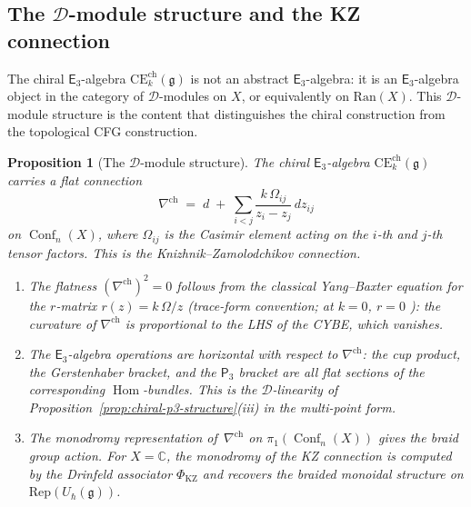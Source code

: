 \documentclass[11pt,reqno]{amsart}
\newtheorem{proposition}[theorem]{Proposition}
\theoremstyle{definition}
\theoremstyle{remark}
\newcommand{\cD}{\mathcal{D}}
\newcommand{\Ran}{\mathrm{Ran}}
\newcommand{\CE}{\mathrm{CE}}
\newcommand{\Ethree}{\mathsf{E}_{3}}
\newcommand{\Pthree}{\mathsf{P}_{3}}
\DeclareMathOperator{\Hom}{Hom}
\DeclareMathOperator{\Conf}{Conf}
\newcommand{\fg}{\mathfrak{g}}
\newcommand{\CC}{\mathbb{C}}
\numberwithin{equation}{section}
\begin{document}
\subsection{The $\cD$-module structure and the KZ connection}
\label{subsec:chiral-e3-dmod}

The chiral $\Ethree$-algebra
$\CE^{\mathrm{ch}}_k(\fg)$ is not an abstract
$\Ethree$-algebra: it is an $\Ethree$-algebra object
in the category of $\cD$-modules on $X$, or equivalently
on $\Ran(X)$. This $\cD$-module structure is the content
that distinguishes the chiral construction from the
topological CFG construction.

\begin{proposition}[The $\cD$-module structure]
\label{prop:chiral-e3-dmod}
The chiral $\Ethree$-algebra
$\CE^{\mathrm{ch}}_k(\fg)$ carries a flat connection
\begin{equation}\label{eq:chiral-e3-connection}
  \nabla^{\mathrm{ch}}
  \;=\;
  d \;+\; \sum_{i < j}
  \frac{k\,\Omega_{ij}}{z_i - z_j}\,dz_{ij}
\end{equation}
on $\Conf_n(X)$, where $\Omega_{ij}$ is the Casimir element
acting on the $i$-th and $j$-th tensor factors. This is the
Knizhnik--Zamolodchikov connection.
\begin{enumerate}[label=\textup{(\roman*)}]
\item The flatness
  $(\nabla^{\mathrm{ch}})^2 = 0$ follows from the
  classical Yang--Baxter equation for the $r$-matrix
  $r(z) = k\,\Omega/z$
  \textup{(}trace-form convention; at $k = 0$, $r = 0$%
  \textup{)}: the curvature of $\nabla^{\mathrm{ch}}$
  is proportional to the LHS of the CYBE, which vanishes.
\item The $\Ethree$-algebra operations are horizontal
  with respect to $\nabla^{\mathrm{ch}}$: the cup product,
  the Gerstenhaber bracket, and the $\Pthree$ bracket are
  all flat sections of the corresponding $\Hom$-bundles.
  This is the $\cD$-linearity of
  Proposition~\textup{\ref{prop:chiral-p3-structure}(iii)}
  in the multi-point form.
\item The monodromy representation of~$\nabla^{\mathrm{ch}}$
  on $\pi_1(\Conf_n(X))$ gives the braid group action.
  For $X = \CC$, the monodromy of the KZ connection
  is computed by the Drinfeld associator
  $\Phi_{\mathrm{KZ}}$
  and recovers the braided monoidal structure on
  $\mathrm{Rep}(U_\hbar(\fg))$.
\end{enumerate}
\end{proposition}
\end{document}
